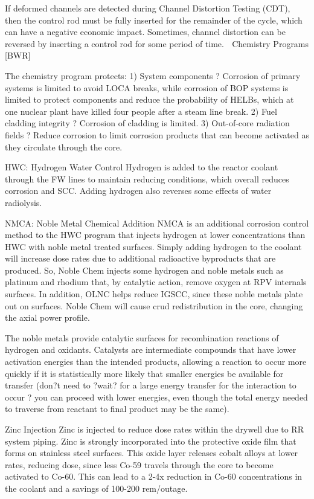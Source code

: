 \documentclass[10pt]{article}
\begin{document}
If deformed channels are detected during Channel Distortion Testing (CDT), then the control rod must be fully inserted for the remainder of the cycle, which can have a negative economic impact. Sometimes, channel distortion can be reversed by inserting a control rod for some period of time. 
Chemistry Programs [BWR]

The chemistry program protects:
1)	System components ? Corrosion of primary systems is limited to avoid LOCA breaks, while corrosion of BOP systems is limited to protect components and reduce the probability of HELBs, which at one nuclear plant have killed four people after a steam line break. 
2)	Fuel cladding integrity ? Corrosion of cladding is limited.
3)	Out-of-core radiation fields ? Reduce corrosion to limit corrosion products that can become activated as they circulate through the core.

HWC: Hydrogen Water Control
Hydrogen is added to the reactor coolant through the FW lines to maintain reducing conditions, which overall reduces corrosion and SCC. Adding hydrogen also reverses some effects of water radiolysis. 

NMCA: Noble Metal Chemical Addition
NMCA is an additional corrosion control method to the HWC program that injects hydrogen at lower concentrations than HWC with noble metal treated surfaces. Simply adding hydrogen to the coolant will increase dose rates due to additional radioactive byproducts that are produced. So, Noble Chem injects some hydrogen and noble metals such as platinum and rhodium that, by catalytic action, remove oxygen at RPV internals surfaces. In addition, OLNC helps reduce IGSCC, since these noble metals plate out on surfaces. Noble Chem will cause crud redistribution in the core, changing the axial power profile.

The noble metals provide catalytic surfaces for recombination reactions of hydrogen and oxidants. Catalysts are intermediate compounds that have lower activation energies than the intended products, allowing a reaction to occur more quickly if it is statistically more likely that smaller energies be available for transfer (don?t need to ?wait? for a large energy transfer for the interaction to occur ? you can proceed with lower energies, even though the total energy needed to traverse from reactant to final product may be the same). 

Zinc Injection
Zinc is injected to reduce dose rates within the drywell due to RR system piping. Zinc is strongly incorporated into the protective oxide film that forms on stainless steel surfaces. This oxide layer releases cobalt alloys at lower rates, reducing dose, since less Co-59 travels through the core to become activated to Co-60. This can lead to a 2-4x reduction in Co-60 concentrations in the coolant and a savings of 100-200 rem/outage.
\end{document}
